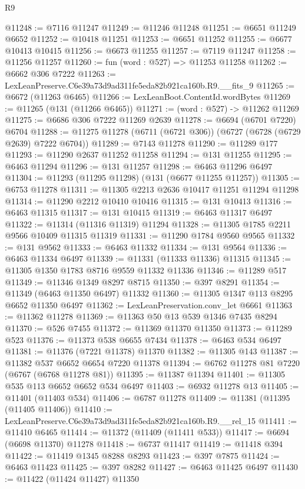 \begin{lexlean}{R9}
\begin{coremodule}
@11248 := @7116 @11247
@11249 := @11246 @11248
@11251 := @6651 @11249 @6652
@11252 := @10418 @11251
@11253 := @6651 @11252
@11255 := @6677 @10413 @10415
@11256 := @6673 @11255
@11257 := @7119 @11247
@11258 := @11256 @11257
@11260 := fun (word : @527) => @11253 @11258
@11262 := @6662 @306 @7222
@11263 := LexLeanPreserve.C6e39a73d9ad311fe5eda82b921ca160b.R9.__fits_9
@11265 := @6672 (@11263 @6465)
@11266 := LexLeanBoot.ContentId.wordBytes
@11269 := @11265 (@131 (@11266 @6465))
@11271 := (word : @527) -> @11262 @11269
@11275 := @6686 @306 @7222 @11269 @2639
@11278 := @6694 (@6701 @7220) @6704
@11288 := @11275 @11278 (@6711 (@6721 @306)) (@6727 (@6728 (@6729 @2639) @7222 @6704))
@11289 := @7143 @11278
@11290 := @11289 @177
@11293 := @11290 @2637 @11252 @11258
@11294 := @131 @11255
@11295 := @6463 @11294
@11296 := @131 @11257
@11298 := @6463 @11296 @6497
@11304 := @11293 (@11295 @11298) (@131 (@6677 @11255 @11257))
@11305 := @6753 @11278
@11311 := @11305 @2213 @2636 @10417 @11251 @11294 @11298
@11314 := @11290 @2212 @10410 @10416
@11315 := @131 @10413
@11316 := @6463 @11315
@11317 := @131 @10415
@11319 := @6463 @11317 @6497
@11322 := @11314 (@11316 @11319) @11294
@11328 := @11305 @1785 @2211 @9566 @10409 @11315 @11319
@11331 := @11290 @1784 @9560 @9565
@11332 := @131 @9562
@11333 := @6463 @11332
@11334 := @131 @9564
@11336 := @6463 @11334 @6497
@11339 := @11331 (@11333 @11336) @11315
@11345 := @11305 @1350 @1783 @8716 @9559 @11332 @11336
@11346 := @11289 @517
@11349 := @11346 @1349 @8297 @8715
@11350 := @397 @8291
@11354 := @11349 (@6463 @11350 @6497) @11332
@11360 := @11305 @1347 @113 @8295 @6652 @11350 @6497
@11362 := LexLeanPreservation.conv_let @6661
@11363 := @11362 @11278
@11369 := @11363 @50 @13 @539 @1346 @7435 @8294
@11370 := @526 @7455
@11372 := @11369 @11370 @11350
@11373 := @11289 @523
@11376 := @11373 @538 @6655 @7434
@11378 := @6463 @534 @6497
@11381 := @11376 (@7221 @11378) @11370
@11382 := @11305 @143
@11387 := @11382 @537 @6652 @6654 @7220 @11378
@11394 := @6762 @11278 @81 @7220 (@6767 (@6768 @11278 @81))
@11395 := @11387 @11394
@11401 := @11305 @535 @113 @6652 @6652 @534 @6497
@11403 := @6932 @11278 @13
@11405 := @11401 (@11403 @534)
@11406 := @6787 @11278
@11409 := @11381 (@11395 (@11405 @11406))
@11410 := LexLeanPreserve.C6e39a73d9ad311fe5eda82b921ca160b.R9.__rel_15
@11411 := @11410 @6465
@11414 := @11372 (@11409 (@11411 @533))
@11417 := @6694 (@6698 @11370) @11278
@11418 := @6737 @11417
@11419 := @11418 @394
@11422 := @11419 @1345 @8288 @8293
@11423 := @397 @7875
@11424 := @6463 @11423
@11425 := @397 @8282
@11427 := @6463 @11425 @6497
@11430 := @11422 (@11424 @11427) @11350

\end{coremodule}
\end{lexlean}
